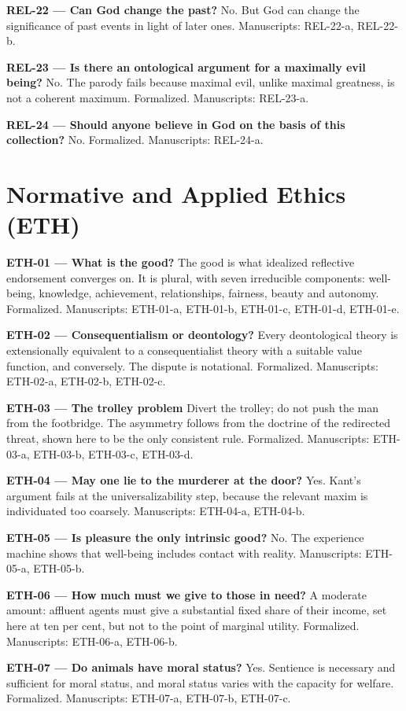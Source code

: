\documentclass[10pt]{article}
\begin{document}
\textbf{REL-22 --- Can God change the past?} No. But God can change the significance of past events in light of later ones. Manuscripts: REL-22-a, REL-22-b.

\textbf{REL-23 --- Is there an ontological argument for a maximally evil being?} No. The parody fails because maximal evil, unlike maximal greatness, is not a coherent maximum. Formalized. Manuscripts: REL-23-a.

\textbf{REL-24 --- Should anyone believe in God on the basis of this collection?} No. Formalized. Manuscripts: REL-24-a.

\section*{Normative and Applied Ethics (ETH)}
\textbf{ETH-01 --- What is the good?} The good is what idealized reflective endorsement converges on. It is plural, with seven irreducible components: well-being, knowledge, achievement, relationships, fairness, beauty and autonomy. Formalized. Manuscripts: ETH-01-a, ETH-01-b, ETH-01-c, ETH-01-d, ETH-01-e.

\textbf{ETH-02 --- Consequentialism or deontology?} Every deontological theory is extensionally equivalent to a consequentialist theory with a suitable value function, and conversely. The dispute is notational. Formalized. Manuscripts: ETH-02-a, ETH-02-b, ETH-02-c.

\textbf{ETH-03 --- The trolley problem} Divert the trolley; do not push the man from the footbridge. The asymmetry follows from the doctrine of the redirected threat, shown here to be the only consistent rule. Formalized. Manuscripts: ETH-03-a, ETH-03-b, ETH-03-c, ETH-03-d.

\textbf{ETH-04 --- May one lie to the murderer at the door?} Yes. Kant's argument fails at the universalizability step, because the relevant maxim is individuated too coarsely. Manuscripts: ETH-04-a, ETH-04-b.

\textbf{ETH-05 --- Is pleasure the only intrinsic good?} No. The experience machine shows that well-being includes contact with reality. Manuscripts: ETH-05-a, ETH-05-b.

\textbf{ETH-06 --- How much must we give to those in need?} A moderate amount: affluent agents must give a substantial fixed share of their income, set here at ten per cent, but not to the point of marginal utility. Formalized. Manuscripts: ETH-06-a, ETH-06-b.

\textbf{ETH-07 --- Do animals have moral status?} Yes. Sentience is necessary and sufficient for moral status, and moral status varies with the capacity for welfare. Formalized. Manuscripts: ETH-07-a, ETH-07-b, ETH-07-c.
\end{document}
